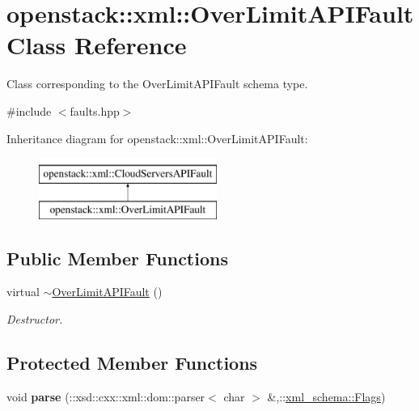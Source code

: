 \hypertarget{classopenstack_1_1xml_1_1OverLimitAPIFault}{
\section{openstack::xml::OverLimitAPIFault Class Reference}
\label{classopenstack_1_1xml_1_1OverLimitAPIFault}
}


Class corresponding to the OverLimitAPIFault schema type.  




{\ttfamily \#include $<$faults.hpp$>$}

Inheritance diagram for openstack::xml::OverLimitAPIFault:\begin{figure}[H]
\begin{center}
\leavevmode
\includegraphics[height=2.000000cm]{classopenstack_1_1xml_1_1OverLimitAPIFault}
\end{center}
\end{figure}
\subsection*{Public Member Functions}
\begin{DoxyCompactItemize}
\item 
\hypertarget{classopenstack_1_1xml_1_1OverLimitAPIFault_a06eacca7c0df5a4a3cbd88168cde5d07}{
virtual \hyperlink{classopenstack_1_1xml_1_1OverLimitAPIFault_a06eacca7c0df5a4a3cbd88168cde5d07}{$\sim$OverLimitAPIFault} ()}
\label{classopenstack_1_1xml_1_1OverLimitAPIFault_a06eacca7c0df5a4a3cbd88168cde5d07}

\begin{DoxyCompactList}\small\item\em Destructor. \item\end{DoxyCompactList}\end{DoxyCompactItemize}
\subsection*{Protected Member Functions}
\begin{DoxyCompactItemize}
\item 
\hypertarget{classopenstack_1_1xml_1_1OverLimitAPIFault_a4c701e4edde6210031fa834dc7758988}{
void {\bfseries parse} (::xsd::cxx::xml::dom::parser$<$ char $>$ \&,::\hyperlink{namespacexml__schema_affb4c227cbd9aa7453dd1dc5a1401943}{xml\_\-schema::Flags})}
\label{classopenstack_1_1xml_1_1OverLimitAPIFault_a4c701e4edde6210031fa834dc7758988}

\end{DoxyCompactItemize}
